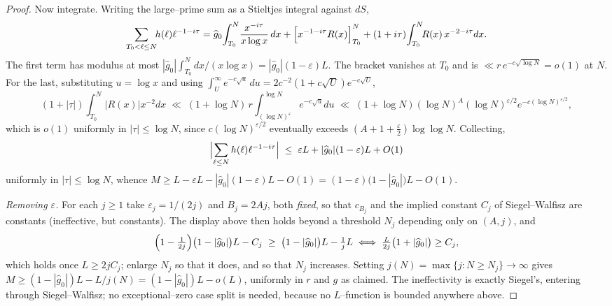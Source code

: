 \documentclass[11pt]{article}
\theoremstyle{definition}
\begin{document}
\begin{proof}
Now integrate. Writing the large--prime sum as a Stieltjes integral against $dS$,
\[ \sum_{T_0<\ell\le N}\!\!h(\ell)\ell^{-1-i\tau}
   =\widehat g_0\!\int_{T_0}^{N}\!\frac{x^{-i\tau}}{x\log x}\,dx
    +\Bigl[x^{-1-i\tau}R(x)\Bigr]_{T_0}^{N}+(1+i\tau)\!\int_{T_0}^{N}\!\!R(x)\,x^{-2-i\tau}dx. \]
The first term has modulus at most
$|\widehat g_0|\int_{T_0}^N dx/(x\log x)=|\widehat g_0|(1-\varepsilon)L$. The bracket vanishes at
$T_0$ and is $\ll r\,e^{-c\sqrt{\log N}}=o(1)$ at $N$. For the last, substituting $u=\log x$ and
using $\int_U^\infty e^{-c\sqrt u}\,du=2c^{-2}(1+c\sqrt U)e^{-c\sqrt U}$,
\[ (1+|\tau|)\!\int_{T_0}^{N}\!|R(x)|x^{-2}dx
   \;\ll\;(1+\log N)\,r\!\int_{(\log N)^{\varepsilon}}^{\log N}\!\!e^{-c\sqrt u}du
   \;\ll\;(1+\log N)(\log N)^{A}(\log N)^{\varepsilon/2}e^{-c(\log N)^{\varepsilon/2}}, \]
which is $o(1)$ uniformly in $|\tau|\le\log N$, since
$c(\log N)^{\varepsilon/2}$ eventually exceeds $(A+1+\tfrac\varepsilon2)\log\log N$. Collecting,
\[ \Bigl|\sum_{\ell\le N}h(\ell)\ell^{-1-i\tau}\Bigr|
   \;\le\;\varepsilon L+|\widehat g_0|(1-\varepsilon)L+O(1) \]
uniformly in $|\tau|\le\log N$, whence
$M\ge L-\varepsilon L-|\widehat g_0|(1-\varepsilon)L-O(1)=(1-\varepsilon)\bigl(1-|\widehat g_0|\bigr)L-O(1)$.

\emph{Removing $\varepsilon$.} For each $j\ge1$ take $\varepsilon_j=1/(2j)$ and $B_j=2Aj$, both
\emph{fixed}, so that $c_{B_j}$ and the implied constant $C_j$ of Siegel--Walfisz are constants
(ineffective, but constants). The display above then holds beyond a threshold $N_j$ depending only
on $(A,j)$, and
\[ \Bigl(1-\tfrac1{2j}\Bigr)\bigl(1-|\widehat g_0|\bigr)L-C_j
   \;\ge\;\bigl(1-|\widehat g_0|\bigr)L-\tfrac1jL
   \iff \tfrac{L}{2j}\bigl(1+|\widehat g_0|\bigr)\ge C_j, \]
which holds once $L\ge2jC_j$; enlarge $N_j$ so that it does, and so that $N_j$ increases. Setting
$j(N)=\max\{j:N\ge N_j\}\to\infty$ gives
$M\ge(1-|\widehat g_0|)L-L/j(N)=(1-|\widehat g_0|)L-o(L)$, uniformly in $r$ and $g$ as claimed.
The ineffectivity is exactly Siegel's, entering through Siegel--Walfisz; no exceptional--zero case
split is needed, because no $L$--function is bounded anywhere above.
\end{proof}
\end{document}
